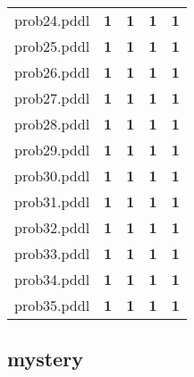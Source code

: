 \documentclass{article}
\begin{document}
\begin{tabular}{@{}lrrrr@{}}
prob24.pddl & \textbf{1} & \textbf{1} & \textbf{1} & \textbf{1} \\
prob25.pddl & \textbf{1} & \textbf{1} & \textbf{1} & \textbf{1} \\
prob26.pddl & \textbf{1} & \textbf{1} & \textbf{1} & \textbf{1} \\
prob27.pddl & \textbf{1} & \textbf{1} & \textbf{1} & \textbf{1} \\
prob28.pddl & \textbf{1} & \textbf{1} & \textbf{1} & \textbf{1} \\
prob29.pddl & \textbf{1} & \textbf{1} & \textbf{1} & \textbf{1} \\
prob30.pddl & \textbf{1} & \textbf{1} & \textbf{1} & \textbf{1} \\
prob31.pddl & \textbf{1} & \textbf{1} & \textbf{1} & \textbf{1} \\
prob32.pddl & \textbf{1} & \textbf{1} & \textbf{1} & \textbf{1} \\
prob33.pddl & \textbf{1} & \textbf{1} & \textbf{1} & \textbf{1} \\
prob34.pddl & \textbf{1} & \textbf{1} & \textbf{1} & \textbf{1} \\
prob35.pddl & \textbf{1} & \textbf{1} & \textbf{1} & \textbf{1} \\
\end{tabular}

\hypertarget{coverage-mystery}{}
\subsection*{mystery}
\end{document}
